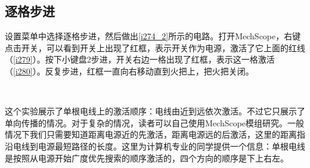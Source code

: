 \subsection{逐格步进}
设置菜单中选择逐格步进，然后做出\autoref{i274_2}所示的电路。打开MechScope，右键点击开关，可以看到开关上出现了红框，表示开关作为电源，激活了它上面的红线（\autoref{i279}）。按下小键盘2步进，开关右边一格出现了红框，表示这一格激活（\autoref{i280}）。反复步进，红框一直向右移动直到火把上，把火把关闭。
\begin{figure}
\begin{center}
\\
\qquad
{}
\qquad
{}
\qquad
{}
\qquad
{}
\qquad
{}
\end{center}
\caption{}
\end{figure}

这个实验展示了单根电线上的激活顺序：电线由近到远依次激活。不过它只展示了单向传播的情况。对于复杂的情况，读者可以自己使用MechScope模组研究。一般情况下我们只需要知道距离电源近的先激活，距离电源远的后激活，这里的距离指沿电线到电源最短路径的长度。这里为计算机专业的同学提供一个信息：单根电线是按照从电源开始广度优先搜索的顺序激活的，四个方向的顺序是下上右左。

